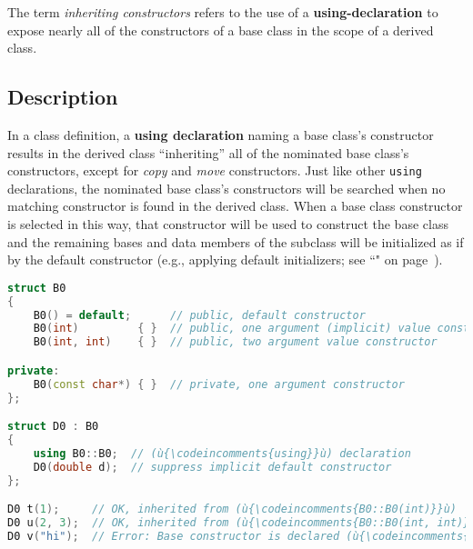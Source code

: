 


\label{inheriting-constructors}
\setcounter{table}{0}
\setcounter{footnote}{0}
\setcounter{lstlisting}{0}



The term \textit{inheriting constructors} refers to the use of a
\textbf{{\ttfamily\bfseries using}-declaration} to expose nearly all of the
constructors of a base class in the scope of a derived class.

\subsection[Description]{Description}\label{description-inheritingctor}

In a class definition, a \textbf{{\ttfamily\bfseries using} declaration} naming a
base class's constructor results in the derived class ``inheriting'' all
of the nominated base class's constructors, except for \emph{copy} and
\emph{move} constructors. Just like other \texttt{using} declarations, the nominated base class's
constructors will be searched when no matching constructor is found in
the derived class. When a base class constructor is selected in this way,
that constructor will be used to construct the base class and the
remaining bases and data members of the subclass will be initialized as
if by the default constructor (e.g., applying default initializers;
see ``" on page~\pageref{Default-Member-Initializers}).

\begin{lstlisting}[language=C++]
struct B0
{
    B0() = default;      // public, default constructor
    B0(int)         { }  // public, one argument (implicit) value constructor
    B0(int, int)    { }  // public, two argument value constructor

private:
    B0(const char*) { }  // private, one argument constructor
};

struct D0 : B0
{
    using B0::B0;  // (ù{\codeincomments{using}}ù) declaration
    D0(double d);  // suppress implicit default constructor
};

D0 t(1);     // OK, inherited from (ù{\codeincomments{B0::B0(int)}}ù)
D0 u(2, 3);  // OK, inherited from (ù{\codeincomments{B0::B0(int, int)}}ù)
D0 v("hi");  // Error: Base constructor is declared (ù{\codeincomments{private}}ù).
\end{lstlisting}

